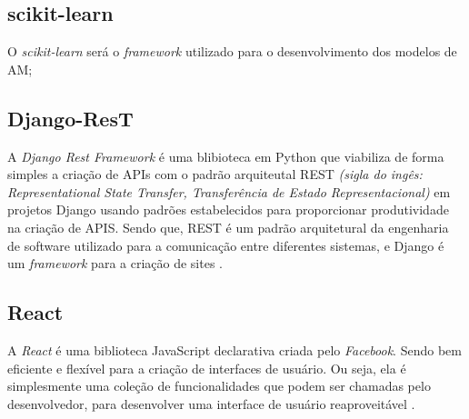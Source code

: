 \subsection{scikit-learn}
O \textit{scikit-learn} será o \textit{framework} utilizado para o desenvolvimento dos modelos de AM;
\subsection{Django-ResT}

A \textit{Django Rest Framework} é uma blibioteca em Python que viabiliza de forma simples a criação de APIs com o padrão arquiteutal REST \textit{(sigla do ingês: Representational State Transfer, Transferência de Estado Representacional)} em projetos Django usando padrões estabelecidos para proporcionar produtividade na criação de APIS. Sendo que, REST é um padrão arquitetural da engenharia de software utilizado para a comunicação entre diferentes sistemas, e Django é um \textit{framework} para a criação de sites \cite{christie2011django}.

\subsection{React}

A \textit{React} é uma biblioteca JavaScript declarativa criada pelo \textit{Facebook}. Sendo bem eficiente e flexível para a criação de interfaces de usuário. Ou seja, ela é simplesmente uma coleção de funcionalidades que podem ser chamadas pelo desenvolvedor, para desenvolver uma interface de usuário reaproveitável \cite{reactjs}.
